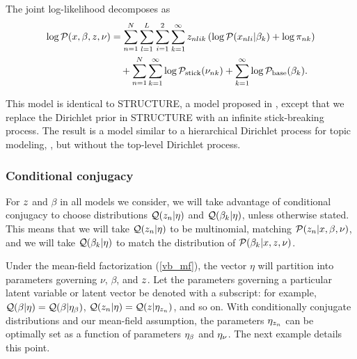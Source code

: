 \begin{ex}
The joint log-likelihood decomposes as
\begin{align*}
\log \mathcal{P}(x, \beta, z, \nu) &=
\sum_{n=1}^N \sum_{l=1}^L \sum_{i = 1}^2 \sum_{k=1}^{\infty}
        z_{nlik} \left(
            \log \mathcal{P}(x_{nli} \vert \beta_{k}) + \log \pi_{nk}
        \right)
\nonumber\\&
    \quad +
    \sum_{n=1}^N \sum_{k=1}^{\infty} \log \mathcal{P}_{\mathrm{stick}}(\nu_{nk})
    + \sum_{k=1}^{\infty} \log \mathcal{P}_{\mathrm{base}}(\beta_{k}).
\end{align*}

This model is identical to STRUCTURE,
a model proposed in \citet{pritchard:2000:structure, raj:2014:faststructure},
except that we replace the Dirichlet prior in STRUCTURE
with an infinite stick-breaking process.
The result is a model similar to a hierarchical Dirichlet process for topic modeling,
\citep{teh:2006:hdp},
but without the top-level Dirichlet process.
%
\end{ex}









\subsubsection{Conditional conjugacy}

For $z$ and $\beta$ in all models we consider, we will
take advantage of conditional conjugacy to choose distributions
$\mathcal{Q}(z_n\vert\eta)$ and $\mathcal{Q}(\beta_k\vert\eta)$, unless otherwise stated.
This means that we will take $\mathcal{Q}(z_{n}
\vert \eta)$ to be multinomial, matching $\mathcal{P}(z_{n}
\vert x, \beta, \nu)$, and we will take $\mathcal{Q}(\beta_k \vert \eta)$
to match the distribution of $\mathcal{P}(\beta_{k} \vert x, z, \nu)$.


Under the mean-field factorization (\eqref{vb_mf}),
the vector $\eta$ will partition into parameters
governing $\nu$, $\beta$, and $z$. Let the parameters governing a
particular latent variable or latent vector be denoted with a subscript: for example,
$\mathcal{Q}(\beta \vert \eta) = \mathcal{Q}(\beta \vert \eta_{\beta})$,
$\mathcal{Q}(z_n \vert \eta) = \mathcal{Q}(z \vert \eta_{z_{n}})$, and so on.
With conditionally conjugate distributions and our mean-field assumption,
the parameters $\eta_{z_{n}}$ can be optimally set as a function of
parameters $\eta_{\beta}$ and $\eta_{\nu}$.
The next example details this point.

